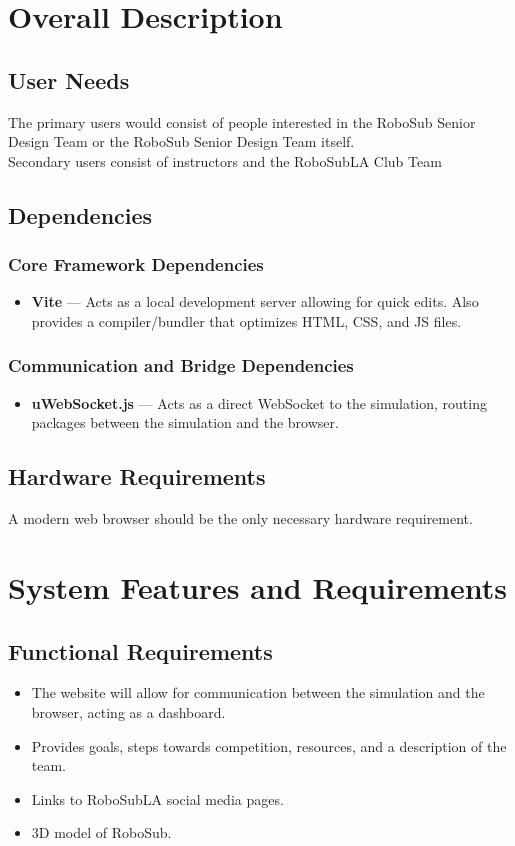 \documentclass[12pt]{article}
\begin{document}
\newpage
\section{Overall Description} 

\subsection{User Needs} 
The primary users would consist of people interested in the RoboSub Senior Design Team or the RoboSub Senior Design Team itself.\\
Secondary users consist of instructors and the RoboSubLA Club Team 

\subsection{Dependencies} 
\subsubsection{Core Framework Dependencies} 
\begin{itemize} 
	\item \textbf{Vite} — Acts as a local development server allowing for quick edits. Also provides a compiler/bundler that optimizes HTML, CSS, and JS files. 
\end{itemize} 
\subsubsection{Communication and Bridge Dependencies} 
\begin{itemize} 
	\item \textbf{uWebSocket.js} — Acts as a direct WebSocket to the simulation, routing packages between the simulation and the browser. 
\end{itemize} 

\subsection{Hardware Requirements} 
A modern web browser should be the only necessary hardware requirement. 

\newpage
\section{System Features and Requirements} 

\subsection{Functional Requirements} 
\begin{itemize} 
	\item The website will allow for communication between the simulation and the browser, acting as a dashboard. 
	\item Provides goals, steps towards competition, resources, and a description of the team. 
	\item Links to RoboSubLA social media pages. 
	\item 3D model of RoboSub. 
\end{itemize} 
	
\end{document}
